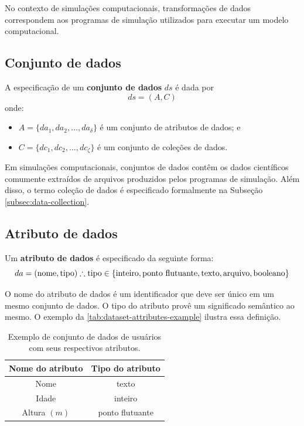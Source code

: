 No contexto de simulações computacionais, transformações de dados correspondem aos programas de simulação utilizados para executar um modelo computacional. 

\subsection{Conjunto de dados}

A especificação de um \textbf{conjunto de dados} \( ds \) é dada por \[ ds = (A, C) \] onde:
\begin{itemize}
    \item \( A = \{da_1, da_2, \ldots, da_{\delta} \} \) é um conjunto de atributos de dados; e
    \item \( C = \{dc_1, dc_2, \ldots, dc_{\zeta} \} \) é um conjunto de coleções de dados.
\end{itemize}

Em simulações computacionais, conjuntos de dados contêm os dados científicos comumente extraídos de arquivos produzidos pelos programas de simulação. Além disso, o termo coleção de dados é especificado formalmente na Subseção \ref{subsec:data-collection}.

\subsection{Atributo de dados}

Um \textbf{atributo de dados} é especificado da seguinte forma: \[ da = (\textrm{nome},\textrm{tipo}) \therefore \textrm{tipo} \in \{\textup{inteiro}, \textup{ponto flutuante}, \textup{texto}, \textup{arquivo}, \textup{booleano}\} \]

O nome do atributo de dados é um identificador que deve ser único em um mesmo conjunto de dados. O tipo do atributo provê um significado semântico ao mesmo. O exemplo da \autoref{tab:dataset-attributes-example} ilustra essa definição.

\begin{table}[htb]
    \centering
    \begin{tabular}{|c|c|}
        \hline
        \textbf{Nome do atributo} & \textbf{Tipo do atributo} \\
        \hline
        Nome             & texto           \\
        \hline
        Idade            & inteiro         \\
        \hline
        Altura \( (m) \) & ponto flutuante \\
        \hline
    \end{tabular}
    \caption[Exemplo de conjunto de dados com seus atributos de dados]{Exemplo de conjunto de dados de usuários com seus respectivos atributos.}%
    \label{tab:dataset-attributes-example}
\end{table}

